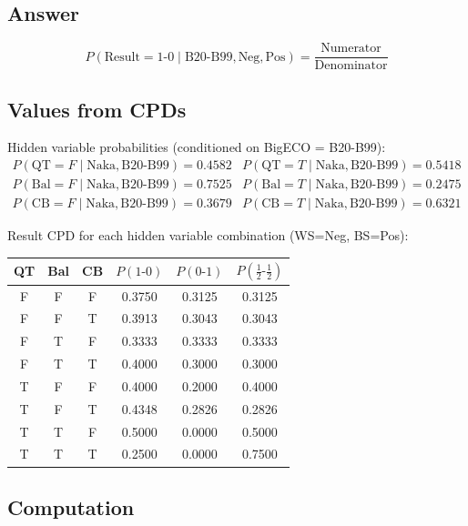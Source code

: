 \documentclass{article}
\begin{document}
\subsection*{Answer}
\[
P(\text{Result}=1\text{-}0 \mid \text{B20-B99}, \text{Neg}, \text{Pos})
= \frac{\text{Numerator}}{\text{Denominator}}
\]

\subsection*{Values from CPDs}

Hidden variable probabilities (conditioned on BigECO = B20-B99):
\begin{align*}
P(\text{QT}=F \mid \text{Naka}, \text{B20-B99}) &= 0.4582 &
P(\text{QT}=T \mid \text{Naka}, \text{B20-B99}) &= 0.5418 \\
P(\text{Bal}=F \mid \text{Naka}, \text{B20-B99}) &= 0.7525 &
P(\text{Bal}=T \mid \text{Naka}, \text{B20-B99}) &= 0.2475 \\
P(\text{CB}=F \mid \text{Naka}, \text{B20-B99}) &= 0.3679 &
P(\text{CB}=T \mid \text{Naka}, \text{B20-B99}) &= 0.6321
\end{align*}

Result CPD for each hidden variable combination (WS=Neg, BS=Pos):

\begin{center}
\begin{tabular}{ccc|ccc}
QT & Bal & CB & $P(1\text{-}0)$ & $P(0\text{-}1)$ & $P(\frac{1}{2}\text{-}\frac{1}{2})$ \\
\hline
F & F & F & 0.3750 & 0.3125 & 0.3125 \\
F & F & T & 0.3913 & 0.3043 & 0.3043 \\
F & T & F & 0.3333 & 0.3333 & 0.3333 \\
F & T & T & 0.4000 & 0.3000 & 0.3000 \\
T & F & F & 0.4000 & 0.2000 & 0.4000 \\
T & F & T & 0.4348 & 0.2826 & 0.2826 \\
T & T & F & 0.5000 & 0.0000 & 0.5000 \\
T & T & T & 0.2500 & 0.0000 & 0.7500 \\
\end{tabular}
\end{center}

\subsection*{Computation}
\end{document}
